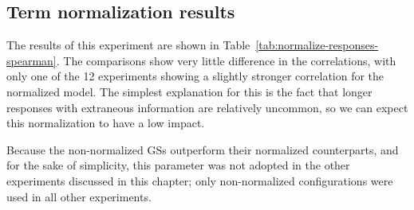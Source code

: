%

\subsection{Term normalization results}
\label{sec:term-norm-results}

The results of this experiment are shown in Table~\ref{tab:normalize-responses-spearman}. The comparisons show very little difference in the correlations, with only one of the 12 experiments showing a slightly stronger correlation for the normalized model. The simplest explanation for this is the fact that longer responses with extraneous information are relatively uncommon, so we can expect this normalization to have a low impact.

Because the non-normalized GSs outperform their normalized counterparts, and for the sake of simplicity, this parameter was not adopted in the other experiments discussed in this chapter; only non-normalized configurations were used in all other experiments.




